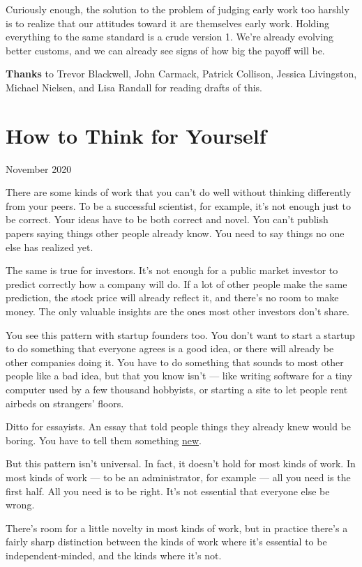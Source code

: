 \documentclass[12pt]{book}
\begin{document}
Curiously enough, the solution to the problem of judging early work too
harshly is to realize that our attitudes toward it are themselves early
work. Holding everything to the same standard is a crude version 1.
We're already evolving better customs, and we can already see signs of
how big the payoff will be.


\textbf{Thanks} to Trevor Blackwell, John Carmack, Patrick Collison,
Jessica Livingston, Michael Nielsen, and Lisa Randall for reading drafts
of this.
\chapter{How to Think for Yourself}

November 2020

There are some kinds of work that you can't do well without thinking
differently from your peers. To be a successful scientist, for example,
it's not enough just to be correct. Your ideas have to be both correct
and novel. You can't publish papers saying things other people already
know. You need to say things no one else has realized yet.

The same is true for investors. It's not enough for a public market
investor to predict correctly how a company will do. If a lot of other
people make the same prediction, the stock price will already reflect
it, and there's no room to make money. The only valuable insights are
the ones most other investors don't share.

You see this pattern with startup founders too. You don't want to start
a startup to do something that everyone agrees is a good idea, or there
will already be other companies doing it. You have to do something that
sounds to most other people like a bad idea, but that you know isn't ---
like writing software for a tiny computer used by a few thousand
hobbyists, or starting a site to let people rent airbeds on strangers'
floors.

Ditto for essayists. An essay that told people things they already knew
would be boring. You have to tell them something
\href{useful.html}{new}.

But this pattern isn't universal. In fact, it doesn't hold for most
kinds of work. In most kinds of work --- to be an administrator, for
example --- all you need is the first half. All you need is to be right.
It's not essential that everyone else be wrong.

There's room for a little novelty in most kinds of work, but in practice
there's a fairly sharp distinction between the kinds of work where it's
essential to be independent-minded, and the kinds where it's not.
\end{document}
